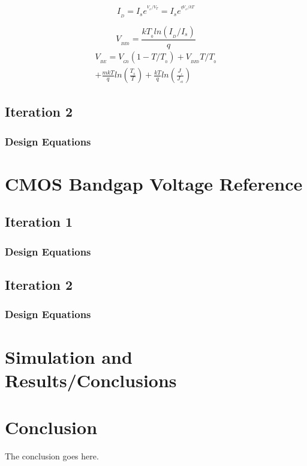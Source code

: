 \documentclass[conference]{IEEEtran}
\begin{document}
\begin{equation}
  I_{_D} = I_se^{^{V_{_D}/V_{T}}} = I_se^{^{qV_{_D}/kT}}
\end{equation}

\begin{equation}
  V_{_{BE0}} = \frac{kT_{_0}ln(I_{_D}/I_s)}{q}
\end{equation}
\begin{multline}
  V_{_{BE}} = V_{_{G0}}(1 - T/T_{_0}) + V_{_{BE0}}T/T_{_0}\\+ \frac{mkT}{q}ln(\frac{T_{_0}}{T}) + \frac{kT}{q}ln(\frac{J_{_c}}{J_{_{c0}}}) 
\end{multline}

\subsection{Iteration 2}
\subsubsection{Design Equations}

\section{CMOS Bandgap Voltage Reference}
\subsection{Iteration 1}
\subsubsection{Design Equations}

\subsection{Iteration 2}
\subsubsection{Design Equations}

\section{Simulation and Results/Conclusions}

\section{Conclusion}
The conclusion goes here.
\end{document}
